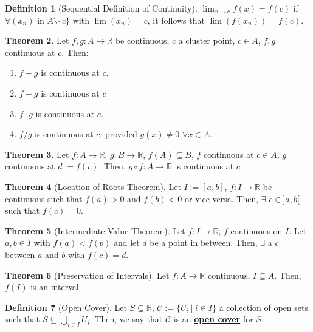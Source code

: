 \documentclass[reqno,11pt]{amsart}
\theoremstyle{definition}
\newtheorem{theorem}{Theorem}
\theoremstyle{definition}
\newtheorem{definition}[theorem]{Definition}
\theoremstyle{remark}
\newcommand{\R}{\mathbb{R}}
\newcommand{\dfn}[1]{\underline{\textbf{#1}}}
\begin{document}
\begin{definition}[Sequential Definition of Continuity] 
	$\lim_{x \rightarrow c} f(x) = f(c)$ if $\forall (x_n)$ in $A \setminus \{ c \}$ with $\lim (x_n) = c$, it follows that $\lim (f(x_n)) = f(c)$.
\end{definition}

\begin{theorem}
	Let $f, g: A \rightarrow \R$ be continuous, $c$ a cluster point, $c \in A$, $f,g$ continuous at $c$. Then:
	\begin{enumerate}[noitemsep]
		\item $f+g$ is continuous at $c$. 
		\item $f-g$ is continuous at $c$
		\item $f \cdot g$ is continuous at $c$. 
		\item $f/g$ is continuous at $c$, provided $g(x) \neq 0$ $\forall x \in A$.
	\end{enumerate}
\end{theorem}

\begin{theorem}
	Let $f: A \rightarrow \R$, $g: B \rightarrow \R$, $f(A) \subseteq B$, $f$ continuous at $c \in A$, $g$ continuous at $d:= f(c)$. Then, $g \circ f: A \rightarrow \R$ is continuous at $c$.
\end{theorem}

\begin{theorem}[Location of Roots Theorem]
	Let $I:=[a,b]$, $f: I \rightarrow \R$ be continuous such that $f(a) > 0$ and $f(b) < 0$ or vice versa. Then, $\exists $ $c \in ]a,b[$ such that $f(c) =0$.
\end{theorem}

\begin{theorem}[Intermediate Value Theorem]
	Let $f: I \rightarrow \R$, $f$ continuous on $I$. Let $a, b \in I$ with $f(a) < f(b)$ and let $d$ be a point in between. Then, $\exists$ a $c$ between $a$ and $b$ with $f(c) =d$.
\end{theorem}

\begin{theorem}[Preservation of Intervals] 
	Let $f: A \rightarrow \R$ continuous, $I \subseteq A$. Then, $f(I)$ is an interval.
\end{theorem}

\begin{definition}[Open Cover]
	Let $S \subseteq \R$, $\mathcal{C} := \{ U_i\ |\ i \in I\}$ a collection of open sets such that $S \subseteq \bigcup_{i \in I}U_i$. Then, we say that $\mathcal{C}$ is an \dfn{open cover} for $S$.
\end{definition}
\end{document}
